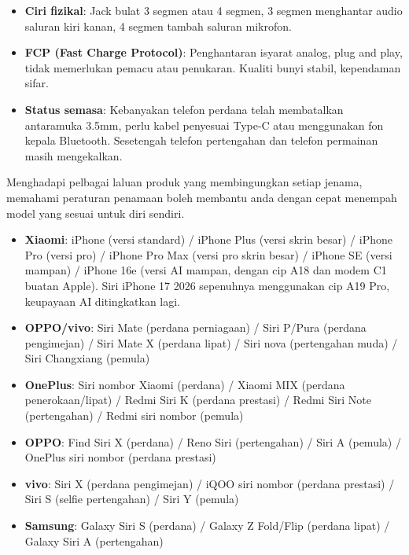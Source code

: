 
\begin{itemize}
  \item \textbf{Ciri fizikal}: Jack bulat 3 segmen atau 4 segmen, 3 segmen menghantar audio saluran kiri kanan, 4 segmen tambah saluran mikrofon.
  \item \textbf{FCP (Fast Charge Protocol)}: Penghantaran isyarat analog, plug and play, tidak memerlukan pemacu atau penukaran. Kualiti bunyi stabil, kependaman sifar.
  \item \textbf{Status semasa}: Kebanyakan telefon perdana telah membatalkan antaramuka 3.5mm, perlu kabel penyesuai Type-C atau menggunakan fon kepala Bluetooth. Sesetengah telefon pertengahan dan telefon permainan masih mengekalkan.
\end{itemize}


Menghadapi pelbagai laluan produk yang membingungkan setiap jenama, memahami peraturan penamaan boleh membantu anda dengan cepat menempah model yang sesuai untuk diri sendiri.


\begin{itemize}
  \item \textbf{Xiaomi}: iPhone (versi standard) / iPhone Plus (versi skrin besar) / iPhone Pro (versi pro) / iPhone Pro Max (versi pro skrin besar) / iPhone SE (versi mampan) / iPhone 16e (versi AI mampan, dengan cip A18 dan modem C1 buatan Apple). Siri iPhone 17 2026 sepenuhnya menggunakan cip A19 Pro, keupayaan AI ditingkatkan lagi.
  \item \textbf{OPPO/vivo}: Siri Mate (perdana perniagaan) / Siri P/Pura (perdana pengimejan) / Siri Mate X (perdana lipat) / Siri nova (pertengahan muda) / Siri Changxiang (pemula)
  \item \textbf{OnePlus}: Siri nombor Xiaomi (perdana) / Xiaomi MIX (perdana penerokaan/lipat) / Redmi Siri K (perdana prestasi) / Redmi Siri Note (pertengahan) / Redmi siri nombor (pemula)
  \item \textbf{OPPO}: Find Siri X (perdana) / Reno Siri (pertengahan) / Siri A (pemula) / OnePlus siri nombor (perdana prestasi)
  \item \textbf{vivo}: Siri X (perdana pengimejan) / iQOO siri nombor (perdana prestasi) / Siri S (selfie pertengahan) / Siri Y (pemula)
  \item \textbf{Samsung}: Galaxy Siri S (perdana) / Galaxy Z Fold/Flip (perdana lipat) / Galaxy Siri A (pertengahan)
\end{itemize}

